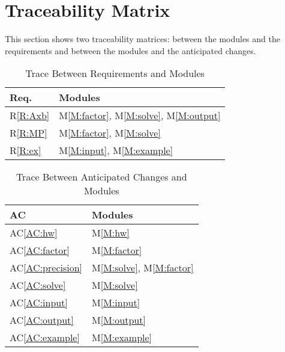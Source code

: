 \documentclass[12pt, titlepage]{article}
\newcommand{\rref}[1]{R\ref{#1}}
\newcommand{\acref}[1]{AC\ref{#1}}
\newcommand{\mref}[1]{M\ref{#1}}
\begin{document}
\section{Traceability Matrix} \label{SecTM}

This section shows two traceability matrices: between the modules and the
requirements and between the modules and the anticipated changes.


\begin{table}[H]
  \centering
  \begin{tabular}{p{} p{}}
    \toprule
    \textbf{Req.}      & \textbf{Modules}                                       \\
    \midrule
    \rref{R:Axb} & \mref{M:factor}, \mref{M:solve}, \mref{M:output} \\
    \rref{R:MP}  & \mref{M:factor}, \mref{M:solve}                  \\
    \rref{R:ex}  & \mref{M:input}, \mref{M:example}                 \\
    \bottomrule
  \end{tabular}
  \caption{Trace Between Requirements and Modules}
  \label{TblRT}
\end{table}

\begin{table}[H]
  \centering
  \begin{tabular}{p{} p{}}
    \toprule
    \textbf{AC}                & \textbf{Modules}                      \\
    \midrule
    \acref{AC:hw}        & \mref{M:hw}                     \\
    \acref{AC:factor}    & \mref{M:factor}                 \\
    \acref{AC:precision} & \mref{M:solve}, \mref{M:factor} \\
    \acref{AC:solve}     & \mref{M:solve}                  \\
    \acref{AC:input}     & \mref{M:input}                  \\
    \acref{AC:output}    & \mref{M:output}                 \\
    \acref{AC:example}   & \mref{M:example}                \\
    \bottomrule
  \end{tabular}
  \caption{Trace Between Anticipated Changes and Modules}
  \label{TblACT}
\end{table}
\end{document}
